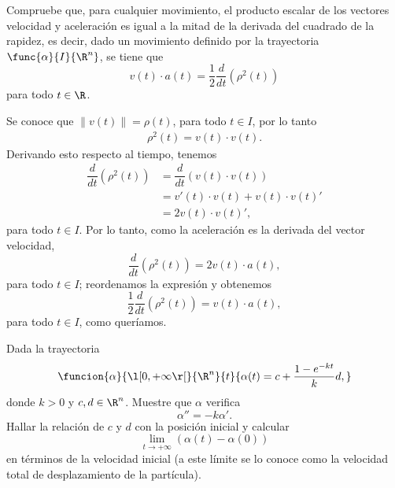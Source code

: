 \documentclass[a4,11pt]{aleph-examen}
\begin{document}
\begin{preguntas}

\item
    Compruebe que, para cualquier movimiento, el producto escalar de los vectores velocidad y aceleración es igual a la mitad de la derivada del cuadrado de la rapidez, es decir, dado un movimiento definido por la trayectoria $\func{\alpha}{I}{\R^n}$, se tiene que
	\[
        v(t)\cdot a(t)=\dfrac{1}{2} \dfrac{d}{dt} (\rho^2(t))
    \]
    para todo $t\in\R$.
    
\begin{respuesta}
   	Se conoce que $\|v(t)\|=\rho(t)$, para todo $t\in I$, por lo tanto
    \begin{align*}
        \rho^2(t) = v(t)\cdot v(t).
	\end{align*}
    Derivando esto respecto al tiempo, tenemos
    \begin{align*}
		\dfrac{d}{dt} (\rho^2(t))
		    & =\dfrac{d}{dt} (v(t) \cdot v(t)) \\
            & = v'(t) \cdot v(t) + v(t) \cdot v(t)'\\
            & = 2 v(t) \cdot v(t)',
	\end{align*}
	para todo $t\in I$. Por lo tanto, como la aceleración es la derivada del vector velocidad, 
	\[
        \dfrac{d}{dt} (\rho^2(t))=2v(t)\cdot a(t),
   	\]
	para todo $t\in I$; reordenamos la expresión y obtenemos
	\[
   		\dfrac{1}{2} \dfrac{d}{dt} (\rho^2(t))=v(t)\cdot a(t),
    \]
    para todo $t\in I$, como queríamos.
\end{respuesta}


\item 
    Dada la trayectoria 
	\[	
        \funcion{\alpha}{\l[0,+\infty\r[}{\R^n}{t}{\alpha(t)=c+\dfrac{1-e^{-kt}}{k}d,}
    \]
	donde $k>0$ y $c,d\in\R^n$.	Muestre que $\alpha$ verifica
    \[
        \alpha''=-k\alpha'.
    \]
	Hallar la relación de $c$ y $d$ con la posición inicial y calcular
    \[
    	\lim_{t\to+\infty} (\alpha(t) - \alpha(0))
    \]
    en términos de la velocidad inicial (a este límite se lo conoce como la velocidad total de desplazamiento de la partícula).


\end{preguntas}
\end{document}
